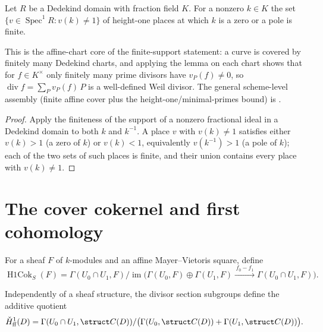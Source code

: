 \begin{lemma}
  \label{thm:adelic_finite_support_order}
  \leanok
  Let \(R\) be a Dedekind domain with fraction field \(K\). For a nonzero
  \(k \in K\) the set \(\{ v \in \operatorname{Spec}^1 R : v(k) \ne 1\}\) of
  height-one places at which \(k\) is a zero or a pole is finite.

  This is the affine-chart core of the finite-support statement: a curve is
  covered by finitely many Dedekind charts, and applying the lemma on each
  chart shows that for \(f \in K^\times\) only finitely many prime divisors
  have \(v_P(f) \ne 0\), so \(\operatorname{div} f = \sum_P v_P(f)\,P\) is a
  well-defined Weil divisor. The general scheme-level assembly (finite affine
  cover plus the height-one/minimal-primes bound) is
  .
\end{lemma}
\begin{proof}
  \leanok
  Apply the finiteness of the support of a nonzero fractional ideal in a
  Dedekind domain to both \(k\) and \(k^{-1}\). A place \(v\) with
  \(v(k) \ne 1\) satisfies either \(v(k) > 1\) (a zero of \(k\)) or
  \(v(k) < 1\), equivalently \(v(k^{-1}) > 1\) (a pole of \(k\)); each of
  the two sets of such places is finite, and their union contains every
  place with \(v(k) \ne 1\).
\end{proof}

\section{The cover cokernel and first cohomology}
\label{sec:RiemannRoch_Adelic_cokernel}

\begin{definition}
  \label{def:adelic_coverH1}
  \leanok
  For a sheaf \(F\) of \(k\)-modules and an affine Mayer--Vietoris square,
  define
  \[
    \operatorname{H1Cok}_S(F)
      =\Gamma(U_0\cap U_1,F)/
        \operatorname{im}\bigl(\Gamma(U_0,F)\oplus\Gamma(U_1,F)
          \xrightarrow{\,f_0-f_1\,}\Gamma(U_0\cap U_1,F)\bigr).
  \]
\end{definition}

\begin{definition}
  \label{def:adelic_function_field_H1}
  \leanok
  Independently of a sheaf structure, the divisor section subgroups define
  the additive quotient
  \[
    \check H^1_{\mathrm{ff}}(D)
      =\Gamma(U_0\cap U_1,\struct C(D))/
        \bigl(\Gamma(U_0,\struct C(D))+\Gamma(U_1,\struct C(D))\bigr).
  \]
\end{definition}

